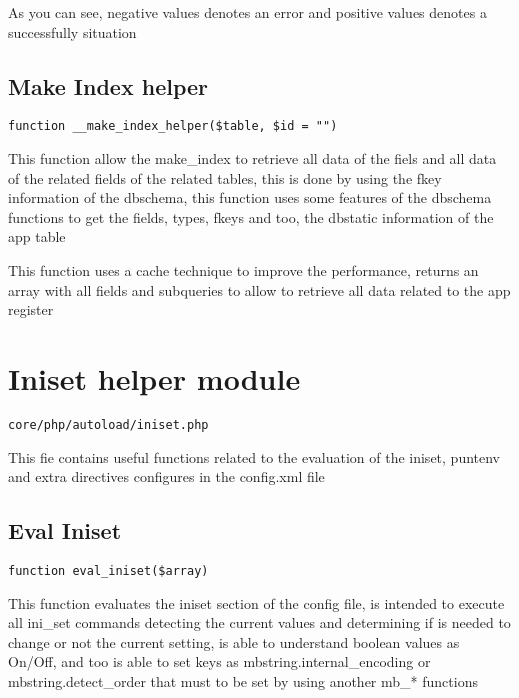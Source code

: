 \documentclass[a4paper]{book}
\begin{document}
As you can see, negative values denotes an error and positive values denotes a successfully situation

\hypertarget{toc177}{}
\subsection{Make Index helper}

\begin{lstlisting}
function __make_index_helper($table, $id = "")
\end{lstlisting}

This function allow the make\_index to retrieve all data of the fiels
and all data of the related fields of the related tables, this is done
by using the fkey information of the dbschema, this function uses some
features of the dbschema functions to get the fields, types, fkeys and
too, the dbstatic information of the app table

This function uses a cache technique to improve the performance, returns
an array with all fields and subqueries to allow to retrieve all data
related to the app register

\hypertarget{toc178}{}
\section{Iniset helper module}

\begin{lstlisting}
core/php/autoload/iniset.php
\end{lstlisting}

This fie contains useful functions related to the evaluation of the iniset, puntenv and extra
directives configures in the config.xml file

\hypertarget{toc179}{}
\subsection{Eval Iniset}

\begin{lstlisting}
function eval_iniset($array)
\end{lstlisting}

This function evaluates the iniset section of the config file, is intended
to execute all ini\_set commands detecting the current values and determining
if is needed to change or not the current setting, is able to understand
boolean values as On/Off, and too is able to set keys as mbstring.internal\_encoding
or mbstring.detect\_order that must to be set by using another mb\_* functions
\end{document}
